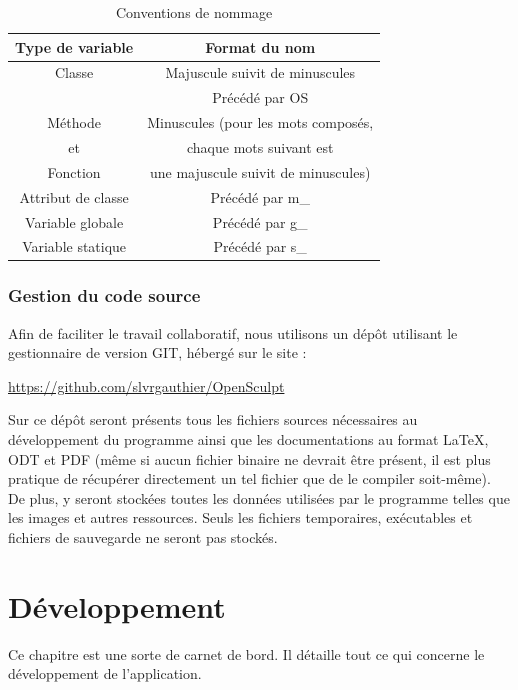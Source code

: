 \documentclass[a4paper]{memoir}
\begin{document}
				\begin{table}[H]
					\begin{small}
						\begin{tabular}{| c | c |}
							\hline
							\textbf{Type de variable} & \textbf{Format du nom}\\
							\hline
							Classe & Majuscule suivit de minuscules\\
							 & Précédé par OS\\
							\hline
							Méthode & Minuscules (pour les mots composés,\\
							et & chaque mots suivant est\\
							Fonction & une majuscule suivit de minuscules)\\
							\hline
							Attribut de classe & Précédé par m\_\\
							\hline
							Variable globale & Précédé par g\_\\
							\hline
							Variable statique & Précédé par s\_\\
							\hline
						\end{tabular}
					\end{small}
					\label{tab:nommage}
					\caption{Conventions de nommage}
				\end{table}

			\subsection{Gestion du code source}
				Afin de faciliter le travail collaboratif, nous utilisons un dépôt utilisant le gestionnaire de version GIT, hébergé sur le site :
				\begin{center}
					\url{https://github.com/slvrgauthier/OpenSculpt}
					\label{url:github}
				\end{center}
				Sur ce dépôt seront présents tous les fichiers sources nécessaires au développement du programme ainsi que les documentations au format \LaTeX, ODT et PDF (même si aucun fichier binaire ne devrait être présent, il est plus pratique de récupérer directement un tel fichier que de le compiler soit-même). De plus, y seront stockées toutes les données utilisées par le programme telles que les images et autres ressources. Seuls les fichiers temporaires, exécutables et fichiers de sauvegarde ne seront pas stockés.


	\chapter{Développement}
		Ce chapitre est une sorte de carnet de bord. Il détaille tout ce qui concerne le développement de l'application.
		
\end{document}
